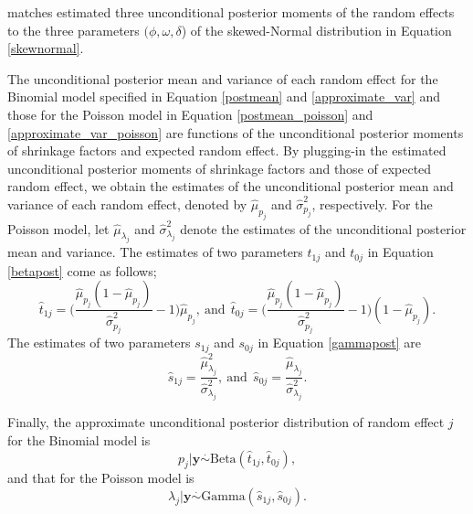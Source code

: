 \documentclass[article]{jss}
\begin{document}
\cite{kelly2014advances}  matches estimated three unconditional posterior  moments of the random effects to the three parameters $(\phi, \omega, \delta$) of the skewed-Normal distribution in Equation \ref{skewnormal}.

The unconditional posterior mean and variance of each random effect for the Binomial model specified in Equation \ref{postmean} and \ref{approximate_var} and those for the Poisson model in Equation \ref{postmean_poisson} and \ref{approximate_var_poisson}  are functions of the unconditional posterior moments of shrinkage factors and expected random effect. By plugging-in the estimated unconditional posterior moments of shrinkage factors and those of expected random effect, we obtain the estimates of the unconditional posterior mean and variance of each random effect, denoted by $\hat{\mu}_{p_j}$ and $\hat{\sigma}^2_{p_j}$, respectively. For the Poisson model, let  $\hat{\mu}_{\lambda_j}$ and $\hat{\sigma}^2_{\lambda_j}$ denote the estimates of the unconditional posterior mean and variance. The estimates of two parameters $t_{1j}$ and $t_{0j}$ in Equation \ref{betapost} come as follows;
\begin{equation}\label{posttrueprob}
\hat{t}_{1j}=\bigg(\frac{\hat{\mu}_{p_j}(1-\hat{\mu}_{p_j})}{\hat{\sigma}^2_{p_j}}-1\bigg)\hat{\mu}_{p_j},~\textrm{and}~~\hat{t}_{0j}=\bigg(\frac{\hat{\mu}_{p_j}(1-\hat{\mu}_{p_j})}{\hat{\sigma}^2_{p_j}}-1\bigg)(1-\hat{\mu}_{p_j}).
\end{equation}
The estimates of two parameters $s_{1j}$ and $s_{0j}$ in Equation \ref{gammapost} are
\begin{equation}\label{posttrueprob}
\hat{s}_{1j}=\frac{\hat{\mu}_{\lambda_j}^2}{\hat{\sigma}^2_{\lambda_j}},~\textrm{and}~~\hat{s}_{0j}=\frac{\hat{\mu}_{\lambda_j}}{\hat{\sigma}^2_{\lambda_j}}.
\end{equation}


Finally, the approximate unconditional posterior distribution of random effect $j$ for the Binomial model is
\begin{equation}\label{trueapprox}
p_j\vert \boldsymbol{y} \stackrel{.}{\sim} \textrm{Beta}(\hat{t}_{1j}, \hat{t}_{0j}),
\end{equation}
and that for the Poisson model is
\begin{equation}\label{trueapprox_poisson}
\lambda_j\vert \boldsymbol{y} \stackrel{.}{\sim} \textrm{Gamma}(\hat{s}_{1j}, \hat{s}_{0j}).
\end{equation}

\end{document}
